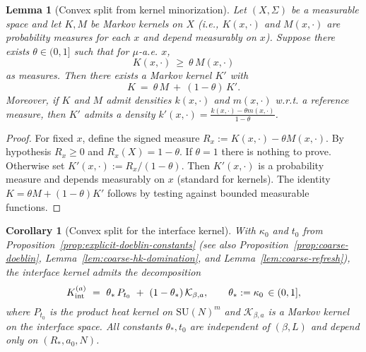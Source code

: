 \documentclass[11pt]{amsart}
\theoremstyle{plain}
\newtheorem{lemma}[theorem]{Lemma}
\newtheorem{corollary}[theorem]{Corollary}
\theoremstyle{definition}
\theoremstyle{remark}
\begin{document}
\begin{lemma}[Convex split from kernel minorization]\label{lem:convex-split}
Let $(X,\Sigma)$ be a measurable space and let $K,M$ be Markov kernels on $X$ (i.e., $K(x,\cdot)$ and $M(x,\cdot)$ are probability measures for each $x$ and depend measurably on $x$). Suppose there exists $\theta\in(0,1]$ such that for $\mu$-a.e. $x$,
\[
  K(x,\cdot)\ \ge\ \theta\, M(x,\cdot)
\]
as measures. Then there exists a Markov kernel $K'$ with
\[
  K\ =\ \theta\,M\ +\ (1-\theta)\,K'.
\]
Moreover, if $K$ and $M$ admit densities $k(x,\cdot)$ and $m(x,\cdot)$ w.r.t. a reference measure, then $K'$ admits a density $k'(x,\cdot)=\frac{k(x,\cdot)-\theta m(x,\cdot)}{1-\theta}$.
\end{lemma}

\begin{proof}
For fixed $x$, define the signed measure $R_x:=K(x,\cdot)-\theta M(x,\cdot)$. By hypothesis $R_x\ge 0$ and $R_x(X)=1-\theta$. If $\theta=1$ there is nothing to prove. Otherwise set $K'(x,\cdot):=R_x/(1-\theta)$. Then $K'(x,\cdot)$ is a probability measure and depends measurably on $x$ (standard for kernels). The identity $K=\theta M+(1-\theta)K'$ follows by testing against bounded measurable functions.
\end{proof}

\begin{corollary}[Convex split for the interface kernel]\label{cor:convex-split-interface}
With $\kappa_0$ and $t_0$ from Proposition~\ref{prop:explicit-doeblin-constants} (see also Proposition~\ref{prop:coarse-doeblin}, Lemma~\ref{lem:coarse-hk-domination}, and Lemma~\ref{lem:coarse-refresh}), the interface kernel admits the decomposition
\[
  K_{\rm int}^{(a)}\ =\ \theta_*\,P_{t_0}\ +\ (1-\theta_*)\,\mathcal K_{\beta,a},\qquad \theta_*:=\kappa_0\,\in(0,1],
\]
where $P_{t_0}$ is the product heat kernel on $\mathrm{SU}(N)^m$ and $\mathcal K_{\beta,a}$ is a Markov kernel on the interface space. All constants $\theta_*,t_0$ are independent of $(\beta,L)$ and depend only on $(R_*,a_0,N)$.
\end{corollary}
\end{document}
